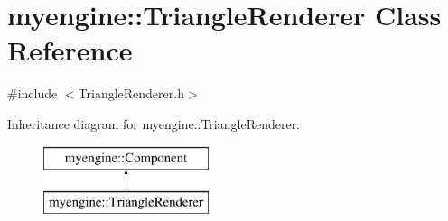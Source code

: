 \hypertarget{classmyengine_1_1_triangle_renderer}{}\section{myengine\+:\+:Triangle\+Renderer Class Reference}
\label{classmyengine_1_1_triangle_renderer}


{\ttfamily \#include $<$Triangle\+Renderer.\+h$>$}

Inheritance diagram for myengine\+:\+:Triangle\+Renderer\+:\begin{figure}[H]
\begin{center}
\leavevmode
\includegraphics[height=2.000000cm]{classmyengine_1_1_triangle_renderer}
\end{center}
\end{figure}
